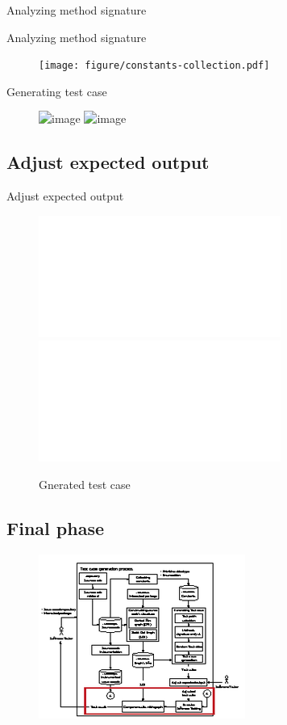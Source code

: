 \documentclass{beamer}
\begin{document}
\begin{frame}{Analyzing method signature}
    \centering
\end{frame}

\begin{frame}{Analyzing method signature}
    \centering
\end{frame}

\begin{frame}
    \begin{figure}
        \texttt{[image: figure/constants-collection.pdf]}
    \end{figure}
\end{frame}

\begin{frame}{Generating test case}
    \begin{figure}
        \includegraphics<1>[height=0.8\paperheight]{figure/Methodology}
        \includegraphics<2>[height=0.8\paperheight]{figure/Methodology-Highlight-1}
    \end{figure}
\end{frame}

\subsection{Adjust expected output}
\begin{frame}{Adjust expected output}
    \begin{figure}
        \includegraphics<1>[width=.8\paperwidth]{figure/example-of-generated-test-case.pdf}
        \includegraphics<2>[width=.8\paperwidth]{figure/adjusted-example-of-generated-test-case.pdf}
        \caption{Gnerated test case}
        \label{fig:expectedOutput}
    \end{figure}
\end{frame}

\subsection{Final phase}
\begin{frame}
    \begin{figure}
        \includegraphics[height=0.8\paperheight]{figure/Methodology-Highlight-2}
    \end{figure}
\end{frame}
\end{document}
